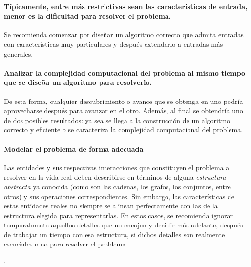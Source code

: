 \paragraph*{Típicamente, entre más restrictivas sean las características de entrada, menor es la dificultad para resolver el problema.}{
  Se recomienda comenzar por diseñar un algoritmo correcto que admita entradas con características muy particulares y después extenderlo a entradas más generales. 
}

\paragraph*{Analizar la complejidad computacional del problema al mismo tiempo que se diseña un algoritmo para resolverlo.}{
  De esta forma, cualquier descubrimiento o avance que se obtenga en uno podría aprovecharse después para avanzar en el otro.
  Además, al final se obtendría uno de dos posibles resultados: ya sea se llega a la construcción de un algoritmo correcto y eficiente o se caracteriza la complejidad computacional del problema.
}

\paragraph*{Modelar el problema de forma adecuada}{
  Las entidades y sus respectivas interacciones que constituyen el problema a resolver en la vida real deben describirse en términos de alguna \emph{estructura abstracta} ya conocida (como son las cadenas, los grafos, los conjuntos, entre otros) y sus operaciones correspondientes.
  Sin embargo, las características de estas entidades reales no siempre se alinean perfectamente con las de la estructura elegida para representarlas.
  En estos casos, se recomienda ignorar temporalmente aquellos detalles que no encajen y decidir más adelante, después de trabajar un tiempo con esa estructura, si dichos detalles son realmente esenciales o no para resolver el problema.
}

.
